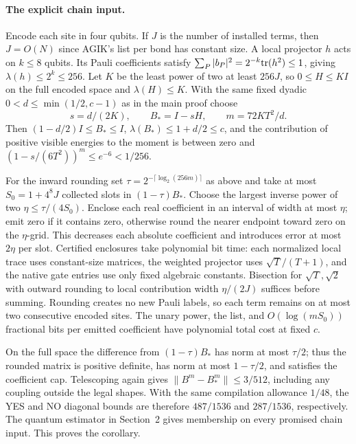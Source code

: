 \documentclass[11pt]{article}
\newcommand{\norm}[1]{\lVert #1\rVert}
\begin{document}
\paragraph{The explicit chain input.}
Encode each site in four qubits. If \(J\) is the number of installed terms, then \(J=O(N)\) since AGIK's list per bond has constant size. A local projector \(h\) acts on \(k\le8\) qubits. Its Pauli coefficients satisfy \(\sum_P|b_P|^2=2^{-k}{\rm tr}(h^2)\le1\), giving \(\lambda(h)\le2^k\le256\). Let \(K\) be the least power of two at least \(256J\), so \(0\le H\le KI\) on the full encoded space and \(\lambda(H)\le K\). With the same fixed dyadic \(0<d\le\min(1/2,c-1)\) as in the main proof choose
\[
 s=d/(2K),\qquad B_*=I-sH,\qquad m=72KT^2/d .
\]
Then \((1-d/2)I\le B_*\le I\), \(\lambda(B_*)\le1+d/2\le c\), and the contribution of positive visible energies to the moment is between zero and \((1-s/(6T^2))^m\le e^{-6}<1/256\).

For the inward rounding set \(\tau=2^{-\lceil\log_2(256m)\rceil}\) as above and take at most \(S_0=1+4^8J\) collected slots in \((1-\tau)B_*\). Choose the largest inverse power of two \(\eta\le\tau/(4S_0)\). Enclose each real coefficient in an interval of width at most \(\eta\); emit zero if it contains zero, otherwise round the nearer endpoint toward zero on the \(\eta\)-grid. This decreases each absolute coefficient and introduces error at most \(2\eta\) per slot. Certified enclosures take polynomial bit time: each normalized local trace uses constant-size matrices, the weighted projector uses \(\sqrt T/(T+1)\), and the native gate entries use only fixed algebraic constants. Bisection for \(\sqrt T,\sqrt2\) with outward rounding to local contribution width \(\eta/(2J)\) suffices before summing. Rounding creates no new Pauli labels, so each term remains on at most two consecutive encoded sites. The unary power, the list, and \(O(\log(mS_0))\) fractional bits per emitted coefficient have polynomial total cost at fixed \(c\).

On the full space the difference from \((1-\tau)B_*\) has norm at most \(\tau/2\); thus the rounded matrix is positive definite, has norm at most \(1-\tau/2\), and satisfies the coefficient cap. Telescoping again gives \(\norm{B^m-B_*^m}\le3/512\), including any coupling outside the legal shapes. With the same compilation allowance \(1/48\), the YES and NO diagonal bounds are therefore \(487/1536\) and \(287/1536\), respectively. The quantum estimator in Section~2 gives membership on every promised chain input. This proves the corollary.
\end{document}
